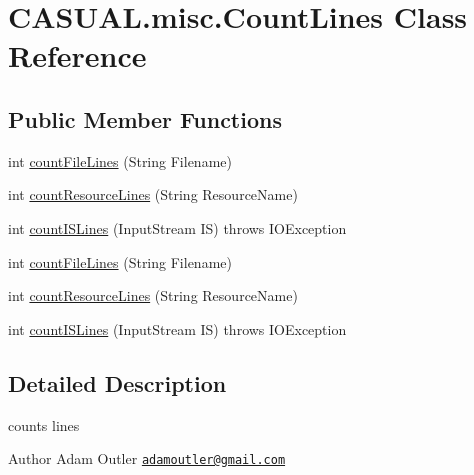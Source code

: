 \hypertarget{class_c_a_s_u_a_l_1_1misc_1_1_count_lines}{\section{C\-A\-S\-U\-A\-L.\-misc.\-Count\-Lines Class Reference}
\label{class_c_a_s_u_a_l_1_1misc_1_1_count_lines}
}
\subsection*{Public Member Functions}
\begin{DoxyCompactItemize}
\item 
int \hyperlink{class_c_a_s_u_a_l_1_1misc_1_1_count_lines_a617b2984f9c9bd62dd346f2ea26ea07f}{count\-File\-Lines} (String Filename)
\item 
int \hyperlink{class_c_a_s_u_a_l_1_1misc_1_1_count_lines_a548bd64e69e6f19f8345de5f6dbf6e08}{count\-Resource\-Lines} (String Resource\-Name)
\item 
int \hyperlink{class_c_a_s_u_a_l_1_1misc_1_1_count_lines_a1e6760716b96cfa27677f6b8a4d66b69}{count\-I\-S\-Lines} (Input\-Stream I\-S)  throws I\-O\-Exception 
\item 
int \hyperlink{class_c_a_s_u_a_l_1_1misc_1_1_count_lines_a617b2984f9c9bd62dd346f2ea26ea07f}{count\-File\-Lines} (String Filename)
\item 
int \hyperlink{class_c_a_s_u_a_l_1_1misc_1_1_count_lines_a548bd64e69e6f19f8345de5f6dbf6e08}{count\-Resource\-Lines} (String Resource\-Name)
\item 
int \hyperlink{class_c_a_s_u_a_l_1_1misc_1_1_count_lines_a1e6760716b96cfa27677f6b8a4d66b69}{count\-I\-S\-Lines} (Input\-Stream I\-S)  throws I\-O\-Exception 
\end{DoxyCompactItemize}


\subsection{Detailed Description}
counts lines \begin{DoxyAuthor}{Author}
Adam Outler \href{mailto:adamoutler@gmail.com}{\tt adamoutler@gmail.\-com} 
\end{DoxyAuthor}


